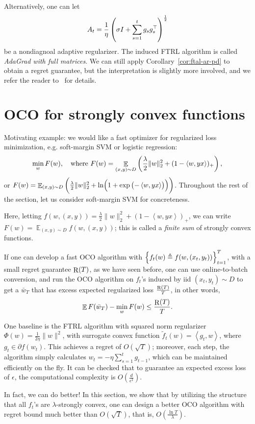 \documentclass{article}
\DeclareMathOperator*{\R}{{\rm R}}
\DeclareMathOperator{\EE}{{\mathbb E}}
\newcommand{\defeq}{\triangleq}
\newcommand{\inner}[2]{\left\langle #1,#2 \right\rangle}
\begin{document}
Alternatively, one can let
\[ A_t = \frac1\eta \del{\sigma I + \sum_{s=1}^t g_s g_s^\top }^\frac12 \]
be a nondiagnoal adaptive regularizer. The induced FTRL algorithm is called {\em AdaGrad with full matrices}. We can still apply Corollary~\ref{cor:ftal-ar-pd} to obtain a regret guarantee, but the interpretation is slightly more involved, and we refer the reader to~\cite[][Section 5.6]{hazan2016introduction} for details.


\section{OCO for strongly convex functions}

Motivating example: we would like a fast optimizer for regularized loss minimization, e.g. soft-margin SVM or logistic regression:
\[ \min_{w} F(w), \quad \text{where } F(w) = \EE_{(x,y) \sim D} \del{\frac\lambda2\|w\|_2^2 + (1-\inner{w}{y x})_+}, \]
or $F(w) = \EE_{(x,y) \sim D} \del{\frac\lambda2\|w\|_2^2 + \ln(1 + \exp\del{-\inner{w}{y x}})}$. Throughout the rest of the section, let us consider soft-margin SVM for concreteness.

Here, letting $f(w, (x,y)) = \frac\lambda2\|w\|_2^2 + (1-\inner{w}{y x})_+$, we can write
$F(w) = \EE_{(x, y) \sim D} f(w, (x,y))$; this is called a {\em finite sum} of strongly convex functions.

If one can develop a fast OCO algorithm with $\cbr{f_t(w) \defeq f(w, (x_t, y_t))}_{t=1}^T$, with a small regret guarantee $\R(T)$, as we have seen before, one can use online-to-batch conversion, and run the OCO algorithm on $f_t$'s induced by iid $(x_t, y_t) \sim D$ to get a $\bar{w}_{T}$ that has excess expected regularized loss $\frac{\R(T)}{T}$, in other words,
\[ \EE F(\bar{w}_T) - \min_{w} F(w) \leq \frac{\R(T)}{T}. \]

One baseline is the FTRL algorithm with squared norm regularizer $\Phi(w) = \frac{1}{2\eta}\|w\|^2$, with surrogate convex function $\tilde{f}_t(w) = \inner{g_t}{w}$, where $g_t \in \partial f(w_t)$. This achieves a regret of $O(\sqrt{T})$; moreover, each step, the algorithm simply calculates $w_t = - \eta \sum_{s=1}^t g_{t-1}$, which can be maintained efficiently on the fly. It can be checked that to guarantee an expected excess loss of $\epsilon$, the computational complexity is $O(\frac{d}{\epsilon^2})$.

In fact, we can do better! In this section, we show that by utilizing the structure that all $f_t$'s are $\lambda$-strongly convex, one can design a better OCO algorithm with regret bound much better than $O(\sqrt{T})$, that is, $O(\frac{\ln T}{\lambda})$.
\end{document}
